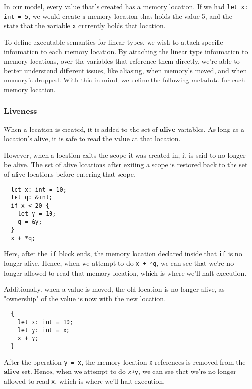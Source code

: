 \documentclass[review,twocolumn]{sigplanconf}
\begin{document}
In our model, every value that's created has a memory location. If we had \verb!let x: int = 5!, we would create a memory location that holds the value 5, and the state that the variable \verb!x! currently holds that location.

To define executable semantics for linear types, we wish to attach specific information to each memory location. By attaching the linear type information to memory locations, over the variables that reference them directly, we're able to better understand different issues, like aliasing, when memory's moved, and when memory's dropped. With this in mind, we define the following metadata for each memory location.

\subsubsection{Liveness}

When a location is created, it is added to the set of \textbf{alive} variables. As long as a location's alive, it is safe to read the value at that location.

However, when a location exits the scope it was created in, it is said to no longer be alive. The set of alive locations after exiting a scope is restored back to the set of alive locations before entering that scope.

\begin{verbatim}
  let x: int = 10;
  let q: &int; 
  if x < 20 {
    let y = 10;
    q = &y;
  }
  x + *q;
\end{verbatim}

Here, after the \verb!if! block ends, the memory location declared inside that \verb!if! is no longer alive. Hence, when we attempt to do \verb!x + *q!, we can see that we're no longer allowed to read that memory location, which is where we'll halt execution.

Additionally, when a value is moved, the old location is no longer alive, as "ownership" of the value is now with the new location.

\begin{verbatim}
  {
    let x: int = 10;
    let y: int = x;
    x + y;
  }
\end{verbatim}

After the operation \verb!y = x!, the memory location \verb!x! references is removed from the \textbf{alive} set. Hence, when we attempt to do \verb!x+y!, we can see that we're no longer allowed to read \verb!x!, which is where we'll halt execution.
\end{document}

